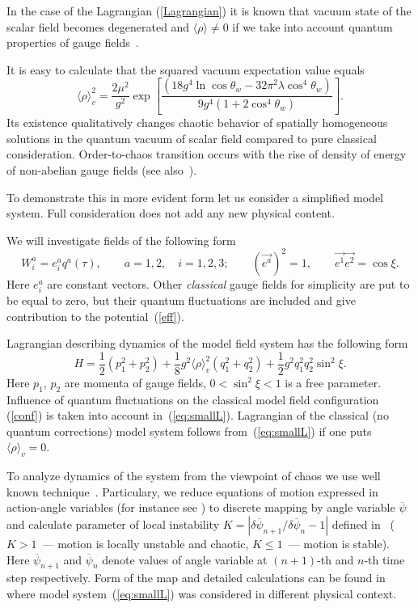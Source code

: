 \documentclass[a4paper,12pt]{article}
\begin{document}
In the case of the Lagrangian (\ref{Lagrangian}) it is known that vacuum state of the
scalar field becomes degenerated and $\langle \rho \rangle \neq 0$ if we take into
account quantum properties of gauge fields~\cite{Huang}.

It is easy to calculate that the squared  vacuum expectation value equals
\begin{equation*}
\langle \rho\rangle_{v}^{2} = \frac{2 \mu^{2}}{g^{2}} \exp\left[ \frac{\left( 18g^{4}
\ln{\cos{\theta_{w}}} - 32\pi^{2} \lambda \cos^{4}{\theta_{w}} \right)}{9g^{4}\left( 1
+ 2\cos^{4}{\theta_{w}} \right)} \right].
\end{equation*}
Its existence qualitatively changes chaotic behavior of spatially homogeneous
solutions in the quantum vacuum of scalar field compared to pure classical
consideration. Order-to-chaos transition occurs with the rise of density of energy of
non-abelian gauge fields (see also~\cite{1997}).

To demonstrate this in more evident form let us consider a simplified model system.
Full consideration does not add any new physical content.

We will investigate fields of the following form
\begin{equation}\label{conf}
W_{i}^{a}=e_{i}^{a}q^{a}\left( \tau \right),\qquad a=1,2, \quad i=1,2,3; \qquad
\left(\vec{e^{a}}\right)^{2}=1 , \qquad \vec{e^{1}}\vec{e^{2}}=\cos{\xi}.
\end{equation}
Here $e^{a}_{i}$ are constant vectors. Other {\it classical} gauge fields for
simplicity are put to be equal to zero, but their quantum fluctuations are included
and give contribution to the potential~(\ref{eff}).

Lagrangian describing dynamics of the model field system has the following form
\begin{equation}  \label{eq:smallL}
H = \frac{1}{2}\left(p_1^2 + p_2^2 \right) + \frac{1}{8} g^{2}\langle
\rho\rangle_{v}^{2} \left(q_{1}^{2} + q_{2}^{2}\right) + \frac{1}{2}
g^{2}q_{1}^{2}q_{2}^{2}\sin^{2}{\xi}.
\end{equation}
Here $p_1$, $p_2$ are momenta of gauge fields, $0<\sin^{2}{\xi}<1$ is a free
parameter. Influence of quantum fluctuations on the classical model field
configuration (\ref{conf}) is taken into account in~(\ref{eq:smallL}). Lagrangian of
the classical (no quantum corrections) model system follows from~(\ref{eq:smallL}) if
one puts $\langle\rho\rangle_{v} = 0$.

To analyze dynamics of the system from the viewpoint of chaos we use well known
technique~\cite{Zaslavsky, Rep}. Particulary, we reduce equations of motion expressed
in action-angle variables (for instance see \cite{Lihtenberg}) to discrete mapping by
angle variable $\overline{\psi}$ and calculate parameter of local instability
$K=|\delta \overline{\psi}_{n+1}/\delta \overline{\psi}_{n} - 1|$ defined
in~\cite{Rep} ($K>1$~--- motion is locally unstable and chaotic, $K\leq 1$~--- motion
is stable). Here $\overline{\psi}_{n+1}$ and $\overline{\psi}_{n}$ denote values of
angle variable at $(n+1)$-th and $n$-th time step respectively. Form of the map and
detailed calculations can be found in~\cite{we3} where model system~(\ref{eq:smallL})
was considered in different physical context.
\end{document}
